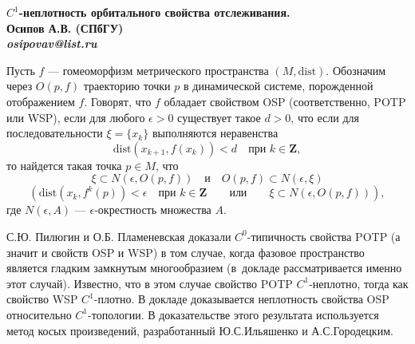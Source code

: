 \documentclass{article}
\begin{document}
\begin{center} \small 
\bf $C^1$-неплотность орбитального свойства отслеживания. \\ 
Осипов А.В. (СПбГУ)\\ 
{\it osipovav@list.ru} 
\end{center} 

 Пусть $f$ --- гомеоморфизм метрического пространства $(M,\textrm{dist})$. Обозначим через $O(p,f)$ траекторию точки $p$ в динамической сис\-теме, порожденной отображением $f$. Говорят, что $f$ обладает свойством OSP (соответственно, POTP или WSP), если для любого $\epsilon>0$ существует такое $d>0$, что если для последовательности $\xi=\{x_k\}$ выполняются неравенства
 $$\textrm{dist}(x_{k+1},f(x_k))<d\quad\textrm{при }k\in\textbf{Z},$$
 то найдется такая точка $p\in M$, что
 $$\xi\subset N(\epsilon,O(p,f))\quad\textrm{и}\quad O(p,f)\subset N(\epsilon,\xi)$$
 $$\left(\textrm{dist}(x_k,f^k(p))<\epsilon\quad\textrm{при }k\in\textbf{Z}\qquad\textrm{или}\qquad\xi\subset N(\epsilon,O(p,f))\right)\!,$$
 где $N(\epsilon,A)$ --- $\epsilon$-окрестность множества $A$.
 
  С.Ю. Пилюгин и О.Б. Пламеневская доказали $C^0$-ти\-пичность свойства POTP (а значит и свойств OSP и WSP) в том случае, когда фазовое пространство является гладким замкнутым многообразием (в~докладе рассматривается именно этот случай). Известно, что в этом случае свойство POTP $C^1$-неплотно, тогда как свойство WSP $C^1$-плотно. В докладе доказывается неплотность свойства OSP относительно $C^1$-топологии. В доказательстве этого результата используется метод косых произведений, разработанный Ю.С.Илья\-шенко и А.С.Городецким.  	 
\end{document}
